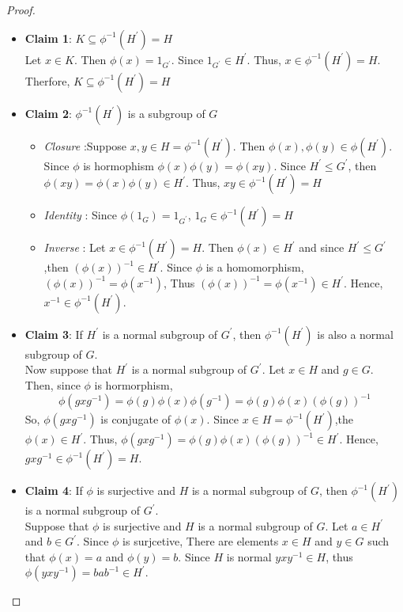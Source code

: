 \documentclass[
]{book}
\providecommand{\tightlist}{%
  \setlength{\itemsep}{0pt}\setlength{\parskip}{0pt}}
\theoremstyle{definition}
\theoremstyle{definition}
\theoremstyle{definition}
\theoremstyle{definition}
\theoremstyle{remark}
\begin{document}
\begin{proof}
\leavevmode

\begin{itemize}
\tightlist
\item
  \textbf{Claim 1}: \(K\subseteq \phi^{-1}(H^\prime)=H\)\\
  Let \(x\in K\). Then \(\phi(x)=1_{G^\prime}\). Since \(1_{G^\prime}\in H^\prime\). Thus, \(x\in \phi^{-1}(H^\prime)=H\). Therfore, \(K\subseteq \phi^{-1}(H^\prime)=H\)
\item
  \textbf{Claim 2}: \(\phi^{-1}(H^\prime)\) is a subgroup of \(G\)\\

  \begin{itemize}
  \tightlist
  \item
    \emph{Closure} :Suppose \(x,y\in H= \phi^{-1}(H^\prime)\). Then \(\phi(x),\phi(y)\in \phi(H^\prime)\). Since \(\phi\) is hormophism \(\phi(x)\phi(y)=\phi(xy)\). Since \(H^\prime\leq G^\prime\), then \(\phi(xy)=\phi(x)\phi(y)\in H^\prime\). Thus, \(xy\in \phi^{-1}(H^\prime)=H\)
  \item
    \emph{Identity} : Since \(\phi(1_G)=1_{G^\prime}\), \(1_G\in \phi^{-1}(H^\prime)=H\)
  \item
    \emph{Inverse} : Let \(x\in \phi^{-1}(H^\prime)=H\). Then \(\phi(x)\in H^\prime\) and since \(H^\prime \leq G^\prime\),then \((\phi(x))^{-1}\in H^\prime\). Since \(\phi\) is a homomorphism, \((\phi(x))^{-1}=\phi(x^{-1})\), Thus \((\phi(x))^{-1}=\phi(x^{-1})\in H^\prime\). Hence, \(x^{-1}\in \phi^{-1}(H^\prime)\).
  \end{itemize}
\item
  \textbf{Claim 3}: If \(H^\prime\) is a normal subgroup of \(G^\prime\), then \(\phi^{-1}(H^\prime)\) is also a normal subgroup of \(G\).\\
  Now suppose that \(H^\prime\) is a normal subgroup of \(G^\prime\). Let \(x\in H\) and \(g\in G\). Then, since \(\phi\) is hormorphism,
  \[\phi(gxg^{-1})=\phi(g)\phi(x)\phi(g^{-1})=\phi(g)\phi(x)(\phi(g))^{-1}\]
  So, \(\phi(gxg^{-1})\) is conjugate of \(\phi(x)\). Since \(x\in H=\phi^{-1}(H^\prime)\),the \(\phi(x)\in H^\prime\). Thus, \(\phi(gxg^{-1})=\phi(g)\phi(x)(\phi(g))^{-1}\in H^\prime\). Hence,
  \(gxg^{-1}\in \phi^{-1}(H^\prime)=H\)\).
\item
  \textbf{Claim 4}: If \(\phi\) is surjective and \(H\) is a normal subgroup of \(G\), then \(\phi^{-1}(H^\prime)\) is a normal subgroup of \(G^\prime\).\\
  Suppose that \(\phi\) is surjective and \(H\) is a normal subgroup of \(G\). Let \(a\in H^\prime\) and \(b\in G^\prime\). Since \(\phi\) is surjcetive, There are elements \(x\in H\) and \(y\in G\) such that \(\phi(x) = a\) and \(\phi(y) = b\). Since \(H\) is normal \(yxy^{- 1}\in H\), thus \(\phi(yxy^{-1})=bab^{-1}\in H^\prime\).
\end{itemize}

\end{proof}
\end{document}
